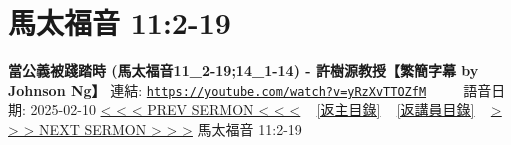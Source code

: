 \documentclass{book}
\begin{document}
\section{馬太福音 11:2-19}
\label{sec:yRzXvTTOZfM}
\textbf{當公義被踐踏時  (馬太福音11\_2-19;14\_1-14) - 許樹源教授【繁簡字幕 by Johnson Ng】}
\newline
\newline
連結: \href{https://youtube.com/watch?v=yRzXvTTOZfM}{\texttt{https://youtube.com/watch?v=yRzXvTTOZfM}} ~~~~ 語音日期: 2025-02-10
\newline
\newline
\hyperref[sec:w_ajWsBZ9eQ]{< < < PREV SERMON < < <}
~
\hyperlink{toc}{[返主目錄]}
~
\hyperref[ch:preacher12]{[返講員目錄]}
~
\hyperref[sec:srCkvhUNl9w]{> > > NEXT SERMON > > >}
\newline
\newline
馬太福音 11:2-19
\newline
\end{document}

